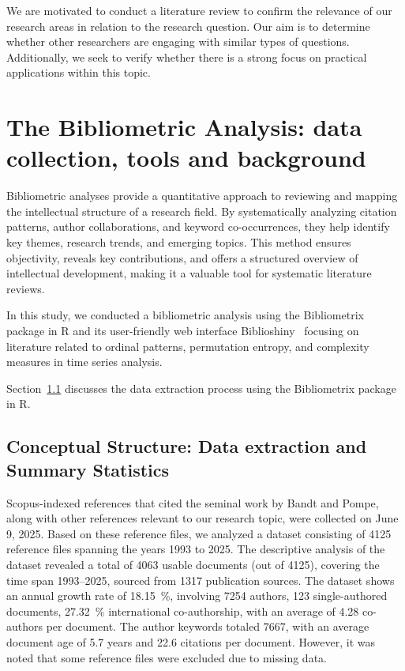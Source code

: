 We are motivated to conduct a literature review to confirm the relevance of our research areas in relation to the research question. Our aim is to determine whether other researchers are engaging with similar types of questions. Additionally, we seek to verify whether there is a strong focus on practical applications within this topic. 


\section{The Bibliometric Analysis: data collection, tools and background}\label{Sec:BiblioIntro}

Bibliometric analyses provide a quantitative approach to reviewing and mapping the intellectual structure of a research field. By systematically analyzing citation patterns, author collaborations, and keyword co-occurrences, they help identify key themes, research trends, and emerging topics. This method ensures objectivity, reveals key contributions, and offers a structured overview of intellectual development, making it a valuable tool for systematic literature reviews.

In this study, we conducted a bibliometric analysis using the Bibliometrix package in R and its user-friendly web interface Biblioshiny~\cite{Aria2017} focusing on literature related to ordinal patterns, permutation entropy, and complexity measures in time series analysis. 

Section~\ref{Subsec:Dataextraction} discusses the data extraction process using the Bibliometrix package in R.

\subsection{Conceptual Structure: Data extraction and Summary Statistics}\label{Subsec:Dataextraction}
Scopus-indexed references that cited the seminal work by Bandt and Pompe, along with other references relevant to our research topic, were collected on June 9, 2025.
Based on these reference files, we analyzed a dataset consisting of 4125 reference files spanning the years 1993 to 2025. %
The descriptive analysis of the dataset revealed a total of 4063 usable documents (out of 4125), covering the time span 1993–2025, sourced from 1317 publication sources. 
The dataset shows an annual growth rate of \SI{18.15}{\percent}, involving 7254 authors, 123 single-authored documents, \SI{27.32}{\percent} international co-authorship, with an average of 4.28 co-authors per document. 
The author keywords totaled 7667, with an average document age of 5.7 years and 22.6 citations per document. However, it was noted that some reference files were excluded due to missing data.

